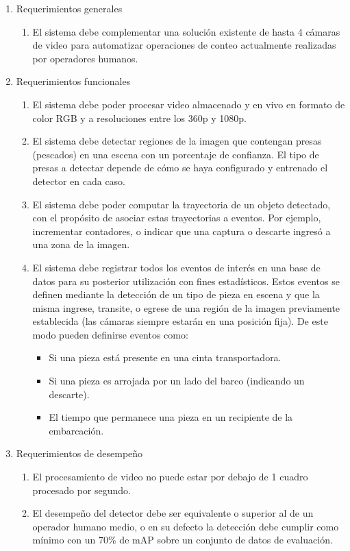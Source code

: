 \documentclass[11pt]{charter}
\begin{document}
\begin{enumerate}
\item Requerimientos generales
	\begin{enumerate}
	\item El sistema debe complementar una solución existente de hasta 4 cámaras de video para automatizar operaciones de conteo actualmente realizadas por operadores humanos.
	\end{enumerate}
\item Requerimientos funcionales
	\begin{enumerate}
	\item El sistema debe poder procesar video almacenado y en vivo en formato de color RGB y a resoluciones entre los 360p y 1080p. 
	\item El sistema debe detectar regiones de la imagen que contengan presas (pescados) en una escena con un porcentaje de confianza. El tipo de presas a detectar depende de cómo se haya configurado y entrenado el detector en cada caso.
	\item El sistema debe poder computar la trayectoria de un objeto detectado, con el propósito de asociar estas trayectorias a eventos. Por ejemplo, incrementar contadores, o indicar que una captura o descarte ingresó a una zona de la imagen.
	\item El sistema debe registrar todos los eventos de interés en una base de datos para su posterior utilización con fines estadísticos. Estos eventos se definen mediante la detección de un tipo de pieza en escena y que la misma ingrese, transite, o egrese de una región de la imagen previamente establecida (las cámaras siempre estarán en una posición fija). De este modo pueden definirse eventos como:
		\begin{itemize}
			\item Si una pieza está presente en una cinta transportadora.
			\item Si una pieza es arrojada por un lado del barco (indicando un descarte).
			\item El tiempo que permanece una pieza en un recipiente de la embarcación.
		\end{itemize}
	\end{enumerate}
\item Requerimientos de desempeño	
	\begin{enumerate}
	\item El procesamiento de video no puede estar por debajo de 1 cuadro procesado por segundo.
	\item El desempeño del detector debe ser equivalente o superior al de un operador humano medio, o en su defecto la detección debe cumplir como mínimo con un 70\% de mAP sobre un conjunto de datos de evaluación.

\end{enumerate}
\end{enumerate}
\end{document}
